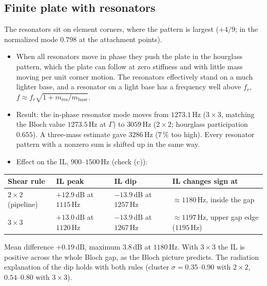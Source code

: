 \documentclass[11pt]{article}
\begin{document}
\subsection{Finite plate with resonators}
The resonators sit on element corners, where the pattern is largest ($+4/9$; in the
normalized mode $0.798$ at the attachment points).
\begin{itemize}
  \item When all resonators move in phase they push the plate in the hourglass pattern,
        which the plate can follow at zero stiffness and with little mass moving per
        unit corner motion. The resonators effectively stand on a much lighter base,
        and a resonator on a light base has a frequency well above $f_r$,
        $f \approx f_r\sqrt{1 + m_\mathrm{res}/m_\mathrm{base}}$.
  \item Result: the in-phase resonator mode moves from $1273.1\,\mathrm{Hz}$ ($3\times 3$,
        matching the Bloch value $1273.5\,\mathrm{Hz}$ at $\Gamma$) to
        $3059\,\mathrm{Hz}$ ($2\times 2$; hourglass participation $0.655$). A
        three-mass estimate gave $3286\,\mathrm{Hz}$ ($7\,\%$ too high). Every
        resonator pattern with a nonzero sum is shifted up in the same way.
  \item Effect on the IL, $900$--$1500\,\mathrm{Hz}$ (check (c)):
\end{itemize}
\begin{center}
\begin{tabular}{|l|l|l|l|}
\hline
Shear rule & IL peak & IL dip & IL changes sign at \\
\hline
$2\times 2$ (pipeline) & $+12.9\,\mathrm{dB}$ at $1115\,\mathrm{Hz}$ & $-13.9\,\mathrm{dB}$ at $1257\,\mathrm{Hz}$ & $\approx 1180\,\mathrm{Hz}$, inside the gap \\
$3\times 3$ & $+13.0\,\mathrm{dB}$ at $1120\,\mathrm{Hz}$ & $-13.9\,\mathrm{dB}$ at $1267\,\mathrm{Hz}$ & $\approx 1197\,\mathrm{Hz}$, upper gap edge ($1195\,\mathrm{Hz}$) \\
\hline
\end{tabular}
\end{center}
Mean difference $+0.19\,\mathrm{dB}$, maximum $3.8\,\mathrm{dB}$ at $1180\,\mathrm{Hz}$.
With $3\times 3$ the IL is positive across the whole Bloch gap, as the Bloch picture
predicts. The radiation explanation of the dip holds with both rules (cluster
$\sigma = 0.35$--$0.90$ with $2\times 2$, $0.54$--$0.80$ with $3\times 3$).
\end{document}
